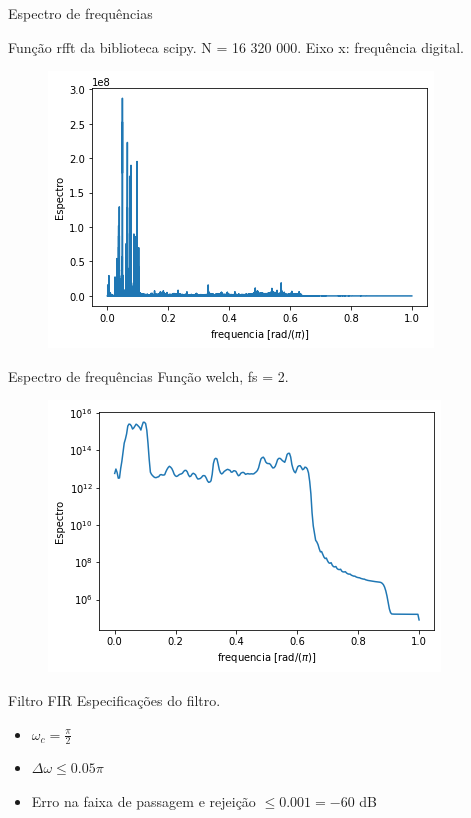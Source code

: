 \documentclass{beamer}
\begin{document}
\begin{frame}{Espectro de frequências}

Função rfft da biblioteca scipy. N = 16 320 000. Eixo x: frequência digital.

\begin{figure}
    \centering
    \includegraphics[scale = 0.7]{freq_espectro.png}
\end{figure}
    
\end{frame}

\begin{frame}{Espectro de frequências}
Função welch, fs = 2. 
\begin{figure}
    \centering
    \includegraphics[scale = 0.7]{welsh_espectro.png}
\end{figure}
\end{frame}

\begin{frame}{Filtro FIR}
Especificações do filtro.
\begin{itemize}
    \item $\omega_c = \frac{\pi}{2}$
    \item $\Delta \omega \leq 0.05 \pi$  
    \item Erro na faixa de passagem e rejeição $\leq 0.001 = -60$ dB
\end{itemize}
\end{frame}
\end{document}
